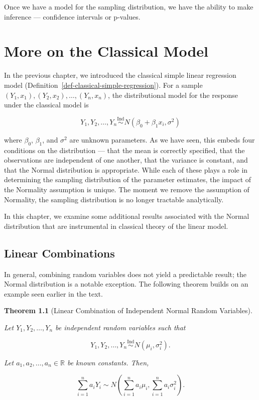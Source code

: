 \documentclass[
  letterpaper,
  DIV=11,
  numbers=noendperiod]{scrreprt}
\theoremstyle{plain}
\newtheorem{theorem}{Theorem}[chapter]
\theoremstyle{definition}
\theoremstyle{definition}
\theoremstyle{remark}
\begin{document}
Once we have a model for the sampling distribution, we have the ability
to make inference --- confidence intervals or p-values.


\hypertarget{sec-normality}{%
\chapter{More on the Classical Model}\label{sec-normality}}

In the previous chapter, we introduced the classical simple linear
regression model (Definition~\ref{def-classical-simple-regression}). For
a sample
\(\left(Y_1, x_1\right), \left(Y_2, x_2\right), \dotsc, \left(Y_n, x_n\right)\),
the distributional model for the response under the classical model is

\[Y_1, Y_2, \dotsc, Y_n \stackrel{\text{Ind}}{\sim} N\left(\beta_0 + \beta_1 x_i, \sigma^2\right)\]

where \(\beta_0\), \(\beta_1\), and \(\sigma^2\) are unknown parameters.
As we have seen, this embeds four conditions on the distribution ---
that the mean is correctly specified, that the observations are
independent of one another, that the variance is constant, and that the
Normal distribution is appropriate. While each of these plays a role in
determining the sampling distribution of the parameter estimates, the
impact of the Normality assumption is unique. The moment we remove the
assumption of Normality, the sampling distribution is no longer
tractable analytically.

In this chapter, we examine some additional results associated with the
Normal distribution that are instrumental in classical theory of the
linear model.

\hypertarget{linear-combinations}{%
\section{Linear Combinations}\label{linear-combinations}}

In general, combining random variables does not yield a predictable
result; the Normal distribution is a notable exception. The following
theorem builds on an example seen earlier in the text.

\begin{theorem}[Linear Combination of Independent Normal Random
Variables]\protect\hypertarget{thm-normal-linear-combination}{}\label{thm-normal-linear-combination}

Let \(Y_1, Y_2, \dotsc, Y_n\) be independent random variables such that

\[Y_1, Y_2, \dotsc, Y_n \stackrel{\text{Ind}}{\sim} N\left(\mu_i, \sigma^2_i\right).\]

Let \(a_1, a_2, \dotsc, a_n \in \mathbb{R}\) be known constants. Then,

\[\sum_{i=1}^{n} a_i Y_i \sim N\left(\sum_{i=1}^{n} a_i \mu_i, \sum_{i=1}^{n} a_i \sigma^2_i\right).\]

\end{theorem}
\end{document}
